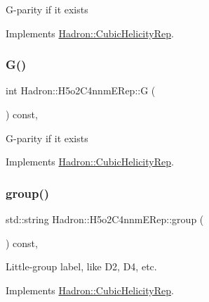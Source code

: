 G-\/parity if it exists 

Implements \mbox{\hyperlink{structHadron_1_1CubicHelicityRep_a50689f42be1e6170aa8cf6ad0597018b}{Hadron\+::\+Cubic\+Helicity\+Rep}}.

\mbox{\label{structHadron_1_1H5o2C4nnmERep_a4bfc67bc8a4c5f245f5e2917a2eaf51e}} 
\subsubsection{\texorpdfstring{G()}{G()}\hspace{0.1cm}{\footnotesize\ttfamily [2/2]}}
{\footnotesize\ttfamily int Hadron\+::\+H5o2\+C4nnm\+E\+Rep\+::G (\begin{DoxyParamCaption}{ }\end{DoxyParamCaption}) const\hspace{0.3cm}{\ttfamily [inline]}, {\ttfamily [virtual]}}

G-\/parity if it exists 

Implements \mbox{\hyperlink{structHadron_1_1CubicHelicityRep_a50689f42be1e6170aa8cf6ad0597018b}{Hadron\+::\+Cubic\+Helicity\+Rep}}.

\mbox{\label{structHadron_1_1H5o2C4nnmERep_aa8513a91bb6679841b0cae22000013c0}} 
\subsubsection{\texorpdfstring{group()}{group()}\hspace{0.1cm}{\footnotesize\ttfamily [1/2]}}
{\footnotesize\ttfamily std\+::string Hadron\+::\+H5o2\+C4nnm\+E\+Rep\+::group (\begin{DoxyParamCaption}{ }\end{DoxyParamCaption}) const\hspace{0.3cm}{\ttfamily [inline]}, {\ttfamily [virtual]}}

Little-\/group label, like D2, D4, etc. 

Implements \mbox{\hyperlink{structHadron_1_1CubicHelicityRep_a101a7d76cd8ccdad0f272db44b766113}{Hadron\+::\+Cubic\+Helicity\+Rep}}.

\mbox{\label{structHadron_1_1H5o2C4nnmERep_aa8513a91bb6679841b0cae22000013c0}} 
